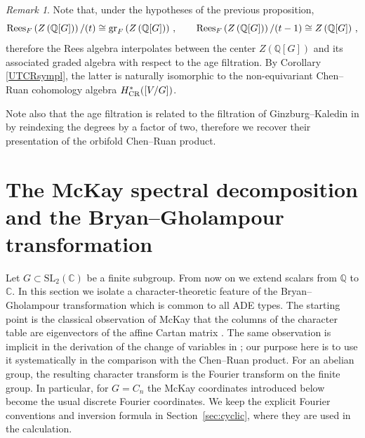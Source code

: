 \documentclass[a4paper,reqno]{amsart}
\theoremstyle{plain} %
\theoremstyle{definition} %
\theoremstyle{remark} %
\newtheorem{rmk}[thm]{Remark}
\newcommand{\Q}{\mathbb{Q}}
\newcommand{\1}{\mathds{1}}   %
\begin{document}
\begin{rmk}\label{interpolation}
Note that, under the hypotheses of the previous proposition, 
$$
{\rm Rees}_F \left( Z\left( \Q[G] \right) \right)/(t) \cong {\rm gr}_F \left( Z\left( \Q[G] \right) \right) \, , \qquad
{\rm Rees}_F \left( Z\left( \Q[G] \right) \right)/(t-1) \cong Z\left( \Q[G] \right) \, , 
$$
therefore the Rees algebra interpolates between the center $Z\left(\Q[G]\right)$ and its associated graded 
algebra with respect to the age filtration. By Corollary \ref{UTCRsympl}, the latter is naturally 
isomorphic to the non-equivariant Chen–Ruan cohomology algebra $H^*_{\rm CR}([V/G])$.

Note also that the age filtration is related to the filtration of Ginzburg–Kaledin in \cite{GK} 
by reindexing the degrees by a factor of two,
therefore we recover their presentation of the orbifold Chen–Ruan product.
\end{rmk}
 





\section{The McKay spectral decomposition and the Bryan–Gholampour transformation}\label{sec:mckay-coordinates}

Let $G\subset \mathrm{SL}_2(\mathbb C)$ be a finite subgroup. From now on we extend scalars from \(\mathbb Q\) to \(\mathbb C\). In this
section we isolate a character-theoretic feature of the Bryan--Gholampour
transformation which is common to all ADE types. The starting point is the
classical observation of McKay that the columns of the character table are
eigenvectors of the affine Cartan matrix \cite{McKay}. The same observation is
implicit in the derivation of the change of variables in
\cite[Sec.~5]{bryan2008root}; our purpose here is to use it systematically in
the comparison with the Chen--Ruan product.  For an abelian group, the resulting
character transform is the Fourier transform on the finite group.  In particular,
for $G=C_n$ the McKay coordinates introduced below become the usual discrete
Fourier coordinates.  We keep the explicit Fourier conventions and inversion
formula in Section~\ref{sec:cyclic}, where they are used in the calculation.
\end{document}
